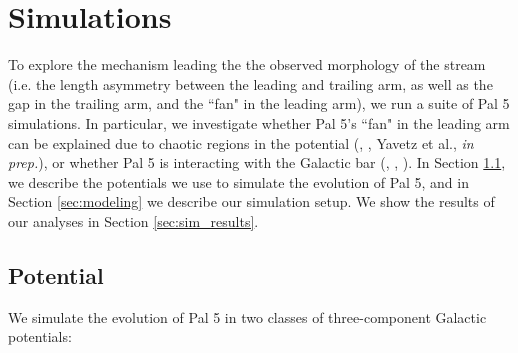 \documentclass[twocolumn]{aastex62}
\begin{document}
\section{Simulations}
\label{sec:sim}
To explore the mechanism leading the the observed morphology of the stream (i.e. the length asymmetry between the leading and trailing arm, as well as the gap in the trailing arm, and the ``fan" in the leading arm), we run a suite of Pal 5 simulations.
In particular, we investigate whether Pal 5's ``fan" in the leading arm can be explained due to chaotic regions in the potential (\citealt{Pearson:2015}, \citealt{Price-Whelan:2016}, Yavetz et al., {\it in prep.}), or whether Pal 5 is interacting with the Galactic bar (\citealt{Erkal:2017}, \citealt{Pearson:2017}, \citealt{Banik:2019}).
In Section \ref{sec:potential}, we describe the potentials we use to simulate the evolution of Pal 5, and in Section \ref{sec:modeling} we describe our simulation setup.
We show the results of our analyses in Section \ref{sec:sim_results}.

\subsection{Potential}
\label{sec:potential}
We simulate the evolution of Pal 5 in two classes of three-component Galactic potentials:
\end{document}
